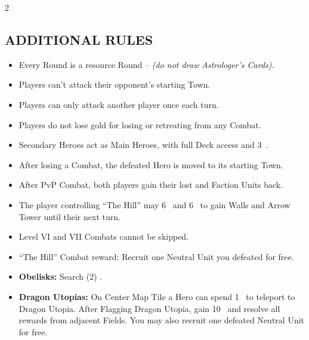 \begin{multicols}{2}
\subsection*{\MakeUppercase{Additional Rules}}
\begin{itemize}
  \item Every Round is a resource Round -- \textit{(do not draw Astrologer's Cards)}.
  \item Players can't attack their opponent's starting Town.
  \item Players can only attack another player once each turn.
  \item Players do not lose gold for losing or retreating from any Combat.
  \item Secondary Heroes act as Main Heroes, with full Deck access and 3~.
  \item After losing a Combat, the defeated Hero is moved to its starting Town.
  \item After PvP Combat, both players gain their lost  and  Faction Units back.
  \item The player controlling ``The Hill'' may  6~ and 6~ to gain Walls and Arrow Tower until their next turn.
  \item Level VI and VII Combats cannot be skipped.
  \item ``The Hill'' Combat reward: Recruit one Neutral Unit you defeated for free.
  \item \textbf{Obelisks:} Search (2) .
  \item \textbf{Dragon Utopias:} On Center Map Tile a Hero can spend 1~ to teleport to Dragon Utopia. After Flagging Dragon Utopia, gain 10~ and resolve all rewards from adjacent Fields. You may also recruit one defeated Neutral Unit for free.
\end{itemize}

\columnbreak

\end{multicols}
